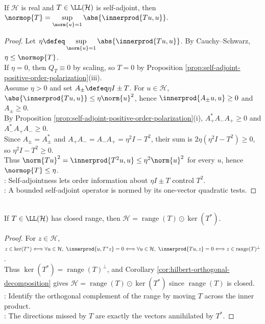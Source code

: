 \begin{theorem} \label{thm:self-adjoint-operator-norm-quadratic-form} \\
If $\mathcal{H}$ is real and $T\in\LL(\mathcal{H})$ is self-adjoint, then
$\normop{T}=\sup\limits_{\norm{u}=1}\abs{\innerprod{Tu,u}}.$
\begin{proof}
Let $\eta\defeq\sup\limits_{\norm{u}=1}\abs{\innerprod{Tu,u}}$. By Cauchy--Schwarz, $\eta\leq\normop{T}$.\\
If $\eta=0$, then $Q_T\equiv0$ by scaling, so $T=0$ by Proposition \ref{prop:self-adjoint-positive-order-polarization}(iii).\\
Assume $\eta>0$ and set $A_\pm\defeq\eta I\pm T$. For $u\in\mathcal H$, $\abs{\innerprod{Tu,u}}\leq\eta\norm{u}^2$, hence $\innerprod{A_\pm u,u}\geq0$ and $A_\pm\geq0$.\\
By Proposition \ref{prop:self-adjoint-positive-order-polarization}(i), $A_+^*A_-A_+\geq0$ and $A_-^*A_+A_-\geq0$.\\
Since $A_\pm=A_\pm^*$ and $A_+A_-=A_-A_+=\eta^2I-T^2$, their sum is $2\eta(\eta^2I-T^2)\geq0$, so $\eta^2I-T^2\geq0$.\\
Thus $\norm{Tu}^2=\innerprod{T^2u,u}\leq\eta^2\norm{u}^2$ for every $u$, hence $\normop{T}\leq\eta$.\\
: Self-adjointness lets order information about $\eta I\pm T$ control $T^2$.\\
: A bounded self-adjoint operator is normed by its one-vector quadratic tests.
\end{proof}
\end{theorem}

\begin{proposition} \label{prop:closed-range-splitting-coercive-invertibility} \\
If $T\in\LL(\mathcal{H})$ has closed range, then $\mathcal{H}=\operatorname{range}(T)\odot\ker(T^*)$.
\begin{proof}
For $z\in\mathcal{H}$, $z\in\ker(T^*)\Longleftrightarrow\forall u\in\mathcal H,\ \innerprod{u,T^*z}=0\Longleftrightarrow\forall u\in\mathcal H,\ \innerprod{Tu,z}=0\Longleftrightarrow z\in\operatorname{range}(T)^\perp$.\\
Thus $\ker(T^*)=\operatorname{range}(T)^\perp$, and Corollary \ref{cor:hilbert-orthogonal-decomposition} gives $\mathcal H=\operatorname{range}(T)\odot\ker(T^*)$ since $\operatorname{range}(T)$ is closed.\\
: Identify the orthogonal complement of the range by moving $T$ across the inner product.\\
: The directions missed by $T$ are exactly the vectors annihilated by $T^*$.
\end{proof}
\end{proposition}


